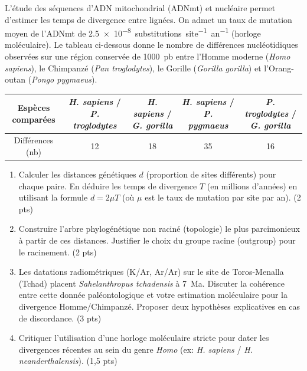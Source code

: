 \documentclass[11pt]{article}
\begin{document}
\begin{exercice}
L'étude des séquences d'ADN mitochondrial (ADNmt) et nucléaire permet d'estimer les temps de divergence entre lignées. On admet un taux de mutation moyen de l'ADNmt de \SI{2,5e-8}{substitutions.site^{-1}.an^{-1}} (horloge moléculaire). Le tableau ci-dessous donne le nombre de différences nucléotidiques observées sur une région conservée de \SI{1000}{pb} entre l'Homme moderne (\textit{Homo sapiens}), le Chimpanzé (\textit{Pan troglodytes}), le Gorille (\textit{Gorilla gorilla}) et l'Orang-outan (\textit{Pongo pygmaeus}).

\begin{center}
\begin{tabular}{|c|c|c|c|c|}
\hline
Espèces comparées & \textit{H. sapiens} / \textit{P. troglodytes} & \textit{H. sapiens} / \textit{G. gorilla} & \textit{H. sapiens} / \textit{P. pygmaeus} & \textit{P. troglodytes} / \textit{G. gorilla} \\
\hline
Différences (nb) & 12 & 18 & 35 & 16 \\
\hline
\end{tabular}
\end{center}

\begin{enumerate}
    \item Calculer les distances génétiques $d$ (proportion de sites différents) pour chaque paire. En déduire les temps de divergence $T$ (en millions d'années) en utilisant la formule $d = 2\mu T$ (où $\mu$ est le taux de mutation par site par an). (2 pts)
    \item Construire l'arbre phylogénétique non raciné (topologie) le plus parcimonieux à partir de ces distances. Justifier le choix du groupe racine (outgroup) pour le racinement. (2 pts)
    \item Les datations radiométriques (K/Ar, Ar/Ar) sur le site de Toros-Menalla (Tchad) placent \textit{Sahelanthropus tchadensis} à \SI{7}{Ma}. Discuter la cohérence entre cette donnée paléontologique et votre estimation moléculaire pour la divergence Homme/Chimpanzé. Proposer deux hypothèses explicatives en cas de discordance. (3 pts)
    \item Critiquer l'utilisation d'une horloge moléculaire stricte pour dater les divergences récentes au sein du genre \textit{Homo} (ex: \textit{H. sapiens} / \textit{H. neanderthalensis}). (1,5 pts)
\end{enumerate}
\end{exercice}
\end{document}
